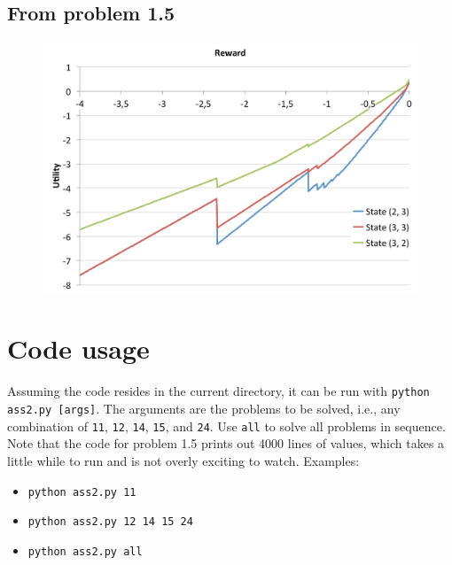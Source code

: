 \documentclass[letterpaper, 10pt]{article}
\begin{document}
\clearpage

\subsection{From problem 1.5}
\label{ssec:prob15fig}
\vfill
\begin{figure}[h]
	\centering
	\includegraphics[width=\textwidth]{prob15}
	\caption{}
	\label{fig:prob15}
\end{figure}
\vfill

\section{Code usage}
Assuming the code resides in the current directory, it can be run with \texttt{python ass2.py [args]}. The arguments are the problems to be solved, i.e., any combination of \texttt{11}, \texttt{12}, \texttt{14}, \texttt{15}, and \texttt{24}. Use \texttt{all} to solve all problems in sequence. Note that the code for problem 1.5 prints out 4000 lines of values, which takes a little while to run and is not overly exciting to watch. Examples:
\begin{itemize}
\item \texttt{python ass2.py 11}
\item \texttt{python ass2.py 12 14 15 24}
\item \texttt{python ass2.py all}
\end{itemize}
\end{document}
